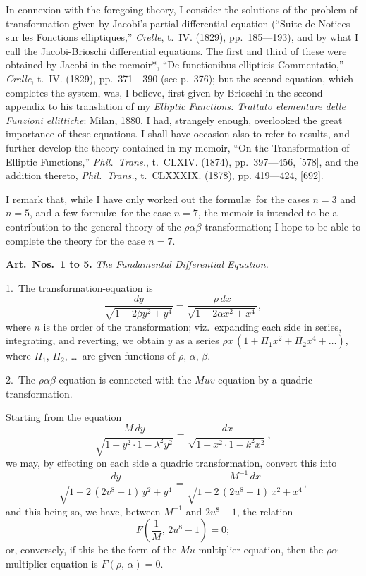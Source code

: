 \documentclass[12pt,a4paper]{article}
\theoremstyle{definition}
\begin{document}
In connexion with the foregoing theory, I consider the solutions of the problem
of transformation given by Jacobi's partial differential equation (``Suite de Notices sur
les Fonctions elliptiques,'' \textit{Crelle}, t.~IV. (1829), pp.~185---193), and by what I call the
Jacobi-Brioschi differential equations. The first and third of these were obtained by
Jacobi in the memoir*, ``De functionibus ellipticis Commentatio,'' \textit{Crelle}, t.~IV. (1829),
pp.~371---390 (see p.~376); but the second equation, which completes the system, was,
I believe, first given by Brioschi in the second appendix to his translation of my
\textit{Elliptic Functions: Trattato elementare delle Funzioni ellittiche}: Milan, 1880. I had,
strangely enough, overlooked the great importance of these equations. I shall have
occasion also to refer to results, and further develop the theory contained in my
memoir, ``On the Transformation of Elliptic Functions,'' \textit{Phil.\ Trans.}, t.~CLXIV. (1874),
pp.~397---456, [578], and the addition thereto, \textit{Phil.\ Trans.}, t.~CLXXXIX. (1878), pp.
419---424, [692].

I remark that, while I have only worked out the formul\ae\ for the cases $n = 3$
and $n = 5$, and a few formul\ae\ for the case $n = 7$, the memoir is intended to be a
contribution to the general theory of the $\rho\alpha\beta$-transformation; I hope to be able to
complete the theory for the case $n = 7$.

\begin{flushright}
\end{flushright}

\newpage
\noindent\textbf{Art.\ Nos.\ 1 to 5.} \textit{The Fundamental Differential Equation.}

1.\ The transformation-equation is
\[
\frac{dy}{\sqrt{1 - 2\beta y^2 + y^4}} = \frac{\rho\, dx}{\sqrt{1 - 2\alpha x^2 + x^4}},
\]
where $n$ is the order of the transformation; viz.\ expanding each side in series,
integrating, and reverting, we obtain $y$ as a series $\rho x\, (1 + \Pi_1 x^2 + \Pi_2 x^4 + \ldots)$,
where $\Pi_1$, $\Pi_2$, \ldots\ are given functions of $\rho$, $\alpha$, $\beta$.

2.\ The $\rho\alpha\beta$-equation is connected with the $Muv$-equation by a quadric transformation.

Starting from the equation
\[
\frac{M\, dy}{\sqrt{1 - y^2 \cdot 1 - \lambda^2 y^2}} = \frac{dx}{\sqrt{1 - x^2 \cdot 1 - k^2 x^2}},
\]
we may, by effecting on each side a quadric transformation, convert this into
\[
\frac{dy}{\sqrt{1 - 2\, (2v^8 - 1)\, y^2 + y^4}}
= \frac{M^{-1}\, dx}{\sqrt{1 - 2\, (2u^8 - 1)\, x^2 + x^4}},
\]
and this being so, we have, between $M^{-1}$ and $2u^8 - 1$, the relation
\[
F\left(\frac{1}{M},\, 2u^8 - 1\right) = 0;
\]
or, conversely, if this be the form of the $Mu$-multiplier equation, then the $\rho\alpha$-multiplier
equation is $F(\rho,\, \alpha) = 0$.
\end{document}
